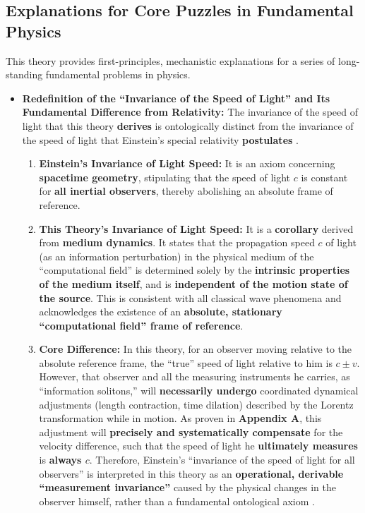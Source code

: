 \documentclass[11pt, a4paper]{article}
\begin{document}
\subsection{Explanations for Core Puzzles in Fundamental Physics}

This theory provides first-principles, mechanistic explanations for a series of long-standing fundamental problems in physics.

\begin{itemize}
    \item \textbf{Redefinition of the ``Invariance of the Speed of Light'' and Its Fundamental Difference from Relativity:}
    The invariance of the speed of light that this theory \textbf{derives} is ontologically distinct from the invariance of the speed of light that Einstein's special relativity \textbf{postulates} \cite{Einstein1905}.
    \begin{enumerate}
        \item \textbf{Einstein's Invariance of Light Speed:} It is an axiom concerning \textbf{spacetime geometry}, stipulating that the speed of light $c$ is constant for \textbf{all inertial observers}, thereby abolishing an absolute frame of reference.
        \item \textbf{This Theory's Invariance of Light Speed:} It is a \textbf{corollary} derived from \textbf{medium dynamics}. It states that the propagation speed $c$ of light (as an information perturbation) in the physical medium of the ``computational field'' is determined solely by the \textbf{intrinsic properties of the medium itself}, and is \textbf{independent of the motion state of the source}. This is consistent with all classical wave phenomena and acknowledges the existence of an \textbf{absolute, stationary ``computational field'' frame of reference}.
        \item \textbf{Core Difference:} In this theory, for an observer moving relative to the absolute reference frame, the ``true'' speed of light relative to him is $c \pm v$. However, that observer and all the measuring instruments he carries, as ``information solitons,'' will \textbf{necessarily undergo} coordinated dynamical adjustments (length contraction, time dilation) described by the Lorentz transformation while in motion. As proven in \textbf{Appendix A}, this adjustment will \textbf{precisely and systematically compensate} for the velocity difference, such that the speed of light he \textbf{ultimately measures} is \textbf{always $c$}. Therefore, Einstein's ``invariance of the speed of light for all observers'' is interpreted in this theory as an \textbf{operational, derivable ``measurement invariance''} caused by the physical changes in the observer himself, rather than a fundamental ontological axiom \cite{Einstein1905}.
    \end{enumerate}


\end{itemize}
\end{document}
